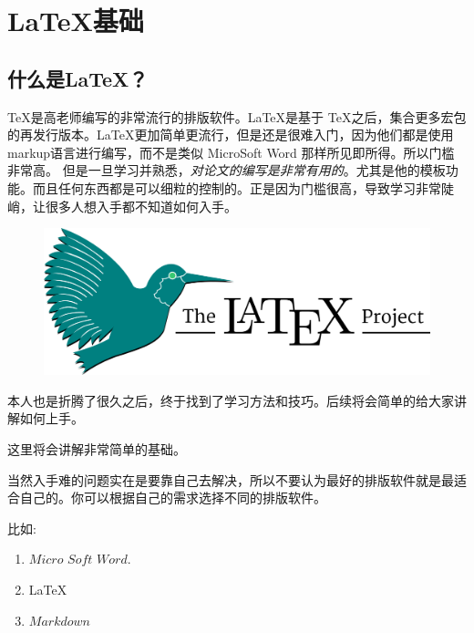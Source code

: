 \documentclass[UTF8,AutoFakeBold]{ctexart}
\numberwithin{figure}{section}
\numberwithin{table}{section}
\begin{document}
\begin{abstract}
    本文是记录在学习 \LaTeX 过程中遇到的问题和解决办法，并用 \LaTeX 写出来。 本文所涉及到的内容足够你完成和本文一样的输出效果。



\end{abstract}

\section{\LaTeX 基础}
\label{sec:knowledge}

\subsection{什么是\LaTeX？}
\TeX 是高老师编写的非常流行的排版软件。\LaTeX 是基于 \TeX 之后，集合更多宏包的再发行版本。\LaTeX 更加简单更流行，但是还是很难入门，因为他们都是使用markup语言进行编写，而不是类似 MicroSoft Word 那样所见即所得。所以门槛非常高。
但是一旦学习并熟悉，\emph{对论文的编写是非常有用的}。尤其是他的模板功能。而且任何东西都是可以细粒的控制的。正是因为门槛很高，导致学习非常陡峭，让很多人想入手都不知道如何入手。

\begin{figure}[htbp]
    \centering
    \includegraphics[center, scale=0.25]{images/1200px_LaTeX_project_logo_bird.svg.png}
\end{figure}

本人也是折腾了很久之后，终于找到了学习方法和技巧。后续将会简单的给大家讲解如何上手。

这里将会讲解非常简单的基础。

当然入手难的问题实在是要靠自己去解决，所以不要认为最好的排版软件就是最适合自己的。你可以根据自己的需求选择不同的排版软件。

比如:
\begin{enumerate}
    \item $Micro$ $Soft$ $Word$.
    \item \LaTeX
    \item $Markdown$
\end{enumerate}
\end{document}

